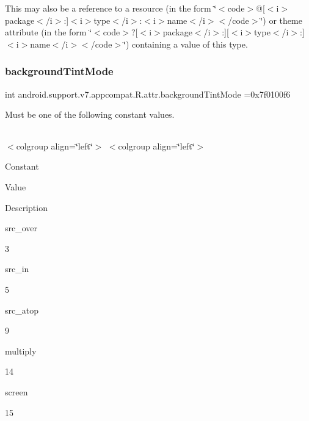 This may also be a reference to a resource (in the form \char`\"{}$<$code$>$@\mbox{[}$<$i$>$package$<$/i$>$\+:\mbox{]}$<$i$>$type$<$/i$>$\+:$<$i$>$name$<$/i$>$$<$/code$>$\char`\"{}) or theme attribute (in the form \char`\"{}$<$code$>$?\mbox{[}$<$i$>$package$<$/i$>$\+:\mbox{]}\mbox{[}$<$i$>$type$<$/i$>$\+:\mbox{]}$<$i$>$name$<$/i$>$$<$/code$>$\char`\"{}) containing a value of this type. \mbox{\label{classandroid_1_1support_1_1v7_1_1appcompat_1_1R_1_1attr_a11663679360aa87a90983ccadc18c5ee}} 
\subsubsection{\texorpdfstring{background\+Tint\+Mode}{backgroundTintMode}}
{\footnotesize\ttfamily int android.\+support.\+v7.\+appcompat.\+R.\+attr.\+background\+Tint\+Mode =0x7f0100f6\hspace{0.3cm}{\ttfamily [static]}}

Must be one of the following constant values.

\tabulinesep=1mm
\begin{longtabu} spread 0pt [c]{*{0}{|X[-1]}|}
\hline
\end{longtabu}
$<$colgroup align=\char`\"{}left\char`\"{}$>$ $<$colgroup align=\char`\"{}left\char`\"{}$>$ 

Constant

Value

Description 

{\ttfamily src\+\_\+over}

3

{\ttfamily src\+\_\+in}

5

{\ttfamily src\+\_\+atop}

9

{\ttfamily multiply}

14

{\ttfamily screen}

15\mbox{\label{classandroid_1_1support_1_1v7_1_1appcompat_1_1R_1_1attr_a7b7ce7358f8999f6e3d75b7456383a9c}} 
